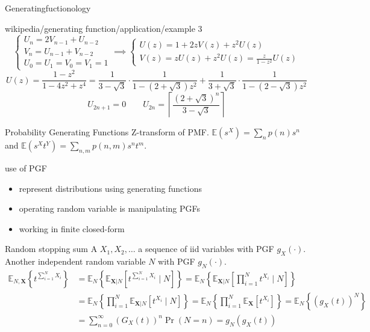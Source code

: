 \documentclass[8pt]{beamer}
\newcommand{\E}{ \mathbb{E} }
\begin{document}
\begin{frame}[allowframebreaks]{Generatingfuctionology\cite{gfbook}}
	\begin{exampleblock}{wikipedia/generating function/application/example 3}
		\[
			\begin{cases}
				U_n = 2V_{n-1} + U_{n-2} \\
				V_n = U_{n-1} + V_{n-2}  \\
				U_0=U_1=V_0=V_1=1
			\end{cases}
			\implies
			\begin{cases}
				U(z) = 1 + 2z V(z) + z^2 U(z) \\
				V(z) = zU(z)+z^2U(z) = \frac{z}{1-z^2}U(z)
			\end{cases}
		\]
		\[
			U(z)={\frac {1-z^{2}}{1-4z^{2}+z^{4}}}={\frac {1}{3-{\sqrt {3}}}}\cdot {\frac {1}{1-\left(2+{\sqrt {3}}\right)z^{2}}}+{\frac {1}{3+{\sqrt {3}}}}\cdot {\frac {1}{1-\left(2-{\sqrt {3}}\right)z^{2}}}
		\]
		\[
			U_{2n+1} = 0 \qquad U_{2n} = \left\lceil \frac{(2+\sqrt 3)^n}{3-\sqrt 3} \right\rceil
		\]
	\end{exampleblock}
\end{frame}
\begin{frame}[allowframebreaks]{Probability Generating Functions}
	Z-transform of PMF. \( \E(s^X) = \sum_n p(n) s^n\) and \( \E(s^X t^Y) = \sum_{n,m} p(n,m) s^n t^m \).
	\begin{block}{use of PGF}
		\begin{itemize}
			\item represent distributions using generating functions
			\item operating random variable is manipulating PGFs
			\item working in finite closed-form
		\end{itemize}
	\end{block}
	\begin{exampleblock}{Random stopping sum}
		A \(X_1, X_2, \ldots\) a sequence of iid variables with PGF \(g_X(\cdot)\). Another independent random variable \(N\) with PGF \(g_N(\cdot)\).
		\begin{align*}
			\E_{N,\mathbf{X}}\left\{ t^{\sum_{i=1}^N X_i} \right\}
			 & = \E_N\left\{ \E_{\mathbf{X}|N}\left[ t^{\sum_{i=1}^N X_i} \mid N \right] \right\}
			= \E_N\left\{ \E_{\mathbf{X}|N}\left[ \prod_{i=1}^N t^{X_i} \mid N \right] \right\}     \\
			 & = \E_N\left\{ \prod_{i=1}^N \E_{\mathbf{X}|N}\left[  t^{X_i} \mid N \right] \right\}
			= \E_N\left\{ \prod_{i=1}^N \E_{\mathbf{X}}\left[  t^{X_i} \right] \right\}
			= \E_N\left\{ {(g_X(t))}^N \right\}                                                     \\
			 & = \sum_{n=0}^{\infty} {(G_X(t))}^n \Pr(N=n)
			= g_N(g_X(t))
		\end{align*}
	\end{exampleblock}
\end{frame}
\end{document}
